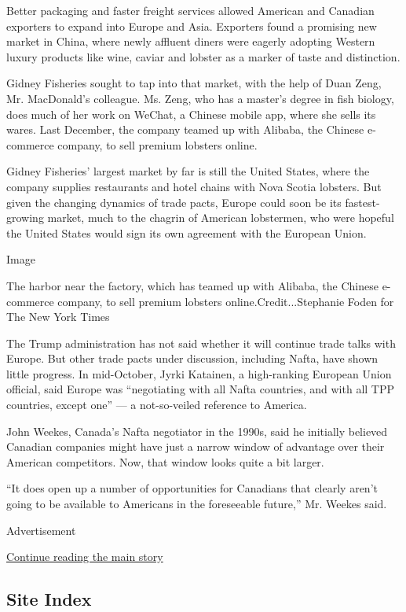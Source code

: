 Better packaging and faster freight services allowed American and
Canadian exporters to expand into Europe and Asia. Exporters found a
promising new market in China, where newly affluent diners were eagerly
adopting Western luxury products like wine, caviar and lobster as a
marker of taste and distinction.

Gidney Fisheries sought to tap into that market, with the help of Duan
Zeng, Mr. MacDonald's colleague. Ms. Zeng, who has a master's degree in
fish biology, does much of her work on WeChat, a Chinese mobile app,
where she sells its wares. Last December, the company teamed up with
Alibaba, the Chinese e-commerce company, to sell premium lobsters
online.

Gidney Fisheries' largest market by far is still the United States,
where the company supplies restaurants and hotel chains with Nova Scotia
lobsters. But given the changing dynamics of trade pacts, Europe could
soon be its fastest-growing market, much to the chagrin of American
lobstermen, who were hopeful the United States would sign its own
agreement with the European Union.

Image

The harbor near the factory, which has teamed up with Alibaba, the
Chinese e-commerce company, to sell premium lobsters
online.Credit...Stephanie Foden for The New York Times

The Trump administration has not said whether it will continue trade
talks with Europe. But other trade pacts under discussion, including
Nafta, have shown little progress. In mid-October, Jyrki Katainen, a
high-ranking European Union official, said Europe was ``negotiating with
all Nafta countries, and with all TPP countries, except one'' --- a
not-so-veiled reference to America.

John Weekes, Canada's Nafta negotiator in the 1990s, said he initially
believed Canadian companies might have just a narrow window of advantage
over their American competitors. Now, that window looks quite a bit
larger.

``It does open up a number of opportunities for Canadians that clearly
aren't going to be available to Americans in the foreseeable future,''
Mr. Weekes said.

Advertisement

\protect\hyperlink{after-bottom}{Continue reading the main story}

\hypertarget{site-index}{%
\subsection{Site Index}\label{site-index}}

